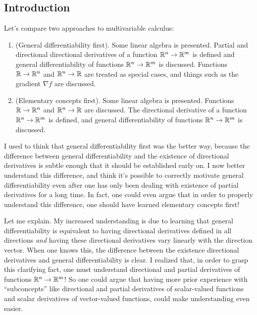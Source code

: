 \subsection*{Introduction}

Let's compare two approaches to multivariable calculus:

\begin{enumerate}
    \item (General differentiability first). Some linear algebra is presented. Partial and directional directional derivatives of a function $\mathbb{R}^n \rightarrow \mathbb{R}^m$ is defined and general differentiability of functions $\mathbb{R}^n \rightarrow \mathbb{R}^m$ is discussed. Functions $\mathbb{R} \rightarrow \mathbb{R}^n$ and $\mathbb{R}^n \rightarrow \mathbb{R}$ are treated as special cases, and things such as the gradient $\nabla f$ are discussed.
    \item (Elementary concepts first). Some linear algebra is presented. Functions $\mathbb{R} \rightarrow \mathbb{R}^n$ and $\mathbb{R}^n \rightarrow \mathbb{R}$ are discussed. The directional derivative of a function $\mathbb{R}^n \rightarrow \mathbb{R}^m$ is defined, and general differentiability of functions $\mathbb{R}^n \rightarrow \mathbb{R}^m$ is discussed.
\end{enumerate}

I used to think that general differentiability first was the better way, because the difference between general differentiability and the existence of directional derivatives is subtle enough that it should be established early on. I now better understand this difference, and think it's possible to correctly motivate general differentiability even after one has only been dealing with existence of partial derivatives for a long time. In fact, one could even argue that in order to properly understand this difference, one should have learned elementary concepts first!

Let me explain. My increased understanding is due to learning that general differentiability is equivalent to having directional derivatives defined in all directions \textit{and} having these directional derivatives vary linearly with the direction vector. When one knows this, the difference between the existence directional derivatives and general differentiability is clear. I realized that, in order to grasp this clarifying fact, one must understand directional and partial derivatives of functions $\mathbb{R}^n \rightarrow \mathbb{R}^m$! So one could argue that having more prior experience with ``subconcepts'' like directional and partial derivatives of scalar-valued functions and scalar derivatives of vector-valued functions, could make understanding even easier.

